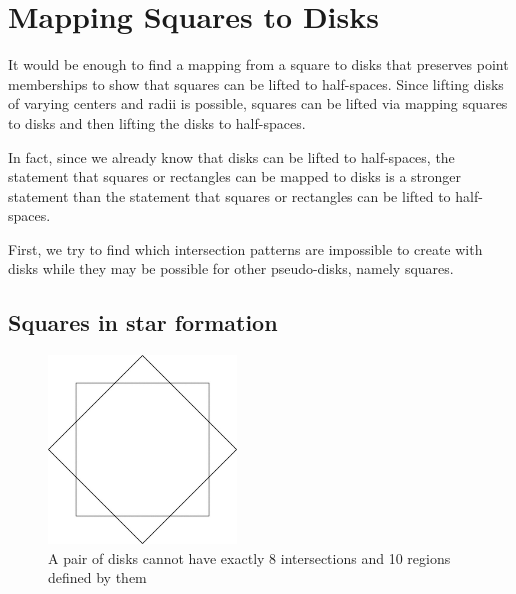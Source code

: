 \documentclass{NSF}
\begin{document}

\section{Mapping Squares to Disks}
It would be enough to find a mapping from a square to disks that preserves point memberships to show that squares can be lifted to half-spaces. Since lifting disks of varying centers and radii is possible, squares can be lifted via mapping squares to disks and then lifting the disks to half-spaces.

In fact, since we already know that disks can be lifted to half-spaces, the statement that squares or rectangles can be mapped to disks is a stronger statement than the statement that squares or rectangles can be lifted to half-spaces. 

First, we try to find which intersection patterns are impossible to create with disks while they may be possible for other pseudo-disks, namely squares.

\subsection{Squares in star formation}

\begin{figure}[ht]
\centering
\includegraphics[width=\textwidth,height=5cm,keepaspectratio]{cocentric-squares}
\caption{ A pair of disks cannot have exactly 8 intersections and 10 regions  defined by them }
\end{figure}
\end{document}
